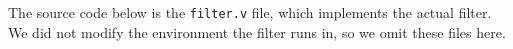 \seqfilter
\label{app:source:seq}

The source code below is the \texttt{filter.v} file, which implements the actual filter.
We did not modify the environment the filter runs in, so we omit these files here.



\strengthfilter
\label{app:source:strength}
